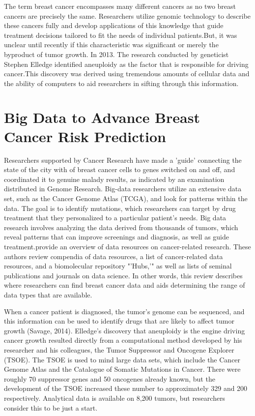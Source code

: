\documentclass[sigconf]{acmart}
\begin{document}
The term breast cancer encompasses many different cancers as no two breast cancers are precisely the same. Researchers utilize genomic technology to describe these cancers fully and develop applications of this knowledge that guide treatment decisions tailored to fit the needs of individual patients\cite{adams}.But, it was unclear until recently if this characteristic was significant or merely the byproduct of tumor growth\cite{savage2014}.  In 2013. The research conducted by geneticist Stephen Elledge identified aneuploidy as the factor that is responsible for driving cancer\cite{ savage2014}.This discovery was derived using tremendous amounts of cellular data and the ability of computers to aid researchers in sifting through this information\cite{savage2014}.

\section{Big Data to Advance Breast Cancer Risk Prediction}

Researchers supported by Cancer Research have made a 'guide' connecting the state of the city with  of breast cancer cells to genes switched on and off, and coordinated it to genuine malady results, as indicated by an examination distributed in Genome Research\cite{hiatt1999new}.  Big-data researchers utilize an extensive data set, such as the Cancer Genome Atlas (TCGA), and look for patterns within the data\cite{adams}.  The goal is to identify mutations, which researchers can target by drug treatment that they personalized to a particular patient's needs\cite{adams}.  Big data research involves analyzing the data derived from thousands of tumors, which reveal patterns that can improve screenings and diagnosis, as well as guide treatment\cite{adams}.\cite{clare}provide an overview of data resources on cancer-related research. These authors review compendia of data resources, a list of cancer-related data resources, and a biomolecular repository "'Hubs,'" as well as lists of seminal publications and journals on data science\cite{clare}.  In other words, this review describes where researchers can find breast cancer data and aids determining the range of data types that are available\cite{clare}.

When a cancer patient is diagnosed, the tumor's genome can be sequenced, and this information can be used to identify drugs that are likely to affect tumor growth (Savage, 2014). Elledge's discovery that aneuploidy is the engine driving cancer growth resulted directly from a computational method developed by his researcher and his colleagues, the Tumor Suppressor and Oncogene Explorer (TSOE)\cite{savage2014}.  The TSOE is used to mind large data sets, which include the Cancer Genome Atlas and the Catalogue of Somatic Mutations in Cancer\cite{savage2014}.  There were roughly 70 suppressor genes and 50 oncogenes already known, but the development of the TSOE increased these number to approximately 329 and 200 respectively\cite{savage2014}.  Analytical data is available on 8,200 tumors, but researchers consider this to be just a start\cite{savage2014}.
\end{document}
